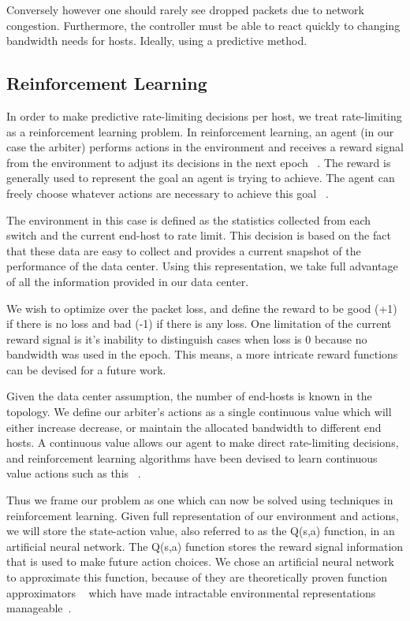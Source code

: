 Conversely however one should rarely see dropped packets due to network 
congestion. Furthermore, the controller must be able to react quickly to 
changing bandwidth needs for hosts. Ideally, using a predictive method.


\subsection{Reinforcement Learning}
In order to make predictive rate-limiting decisions per host, we treat rate-limiting as a reinforcement learning problem. In reinforcement learning, an agent (in our case the arbiter) performs actions 
in the environment and receives a reward signal from the environment to adjust 
its decisions in the next epoch ~\cite{Sutton:1998:IRL:551283}. The reward is 
generally used to represent the goal an agent is trying to achieve. The agent 
can freely choose whatever actions are necessary to achieve this goal 
~\cite{Sutton:1998:IRL:551283}.

The environment in this case is defined as the statistics collected from each 
switch and the current end-host to rate limit. This decision is based on the fact that these data are easy to collect and provides a current snapshot of the performance of the data center. Using this representation, we take full advantage of all the information provided in our data center.

We wish to optimize over the packet loss, and define the reward to be good (+1) if there is no loss and bad (-1) if there is any loss.  One limitation of the current reward signal is it's inability to distinguish cases when loss is 0 because no bandwidth was used in the epoch. This means, a more intricate reward functions can be devised for  a future work.

Given the data center assumption, the number of end-hosts is known in the 
topology. We define our arbiter's actions as a single continuous value which will either increase 
decrease, or maintain the allocated bandwidth to different end hosts. A continuous value allows our agent to make direct rate-limiting decisions, and reinforcement learning algorithms have been devised to learn continuous value actions such as this ~\cite{DDPG}. 

Thus we frame our problem as one which can now be solved using techniques in reinforcement learning. Given full representation of our environment and 
actions, we will store the state-action value, also referred to as the Q(s,a) function,  in an artificial neural network. The Q(s,a) function 
stores the reward signal information that is used to make future action choices. We chose an artificial neural network to approximate this function, because of they are theoretically proven function approximators ~\cite{Cybenko1989} which have made intractable environmental representations manageable~\cite{Sutton:1998:IRL:551283}.




